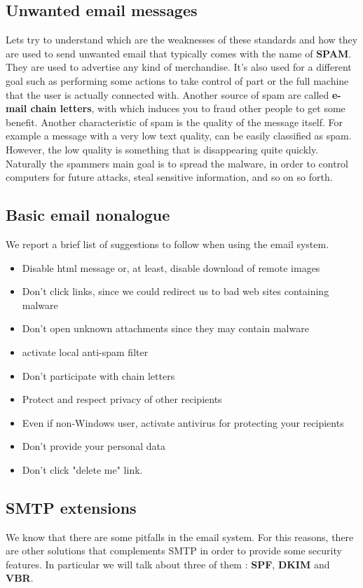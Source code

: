 \subsection{Unwanted email messages}
Lets try to understand which are the weaknesses of these standards and how they are used to send unwanted email that typically comes with the name of \textbf{SPAM}. They are used to advertise any kind of merchandise. It's also used for a different goal such as performing some actions to take control of part or the full machine that the user is actually connected with. Another source of spam are called \textbf{e-mail chain letters}, with which induces you to fraud other people to get some benefit. Another characteristic of spam is the quality of the message itself. For example a message with a very low text quality, can be easily classified as spam. However, the low quality is something that is disappearing quite quickly. Naturally the spammers main goal is to spread the malware, in order to control computers for future attacks, steal sensitive information, and so on so forth.
\subsection{Basic email nonalogue}
We report a brief list of suggestions to follow when using the email system.
\begin{itemize}
\item Disable html message or, at least, disable download of remote images
\item Don't click links, since we could redirect us to bad web sites containing malware
\item Don't open unknown attachments since they may contain malware
\item activate local anti-spam filter
\item Don't participate with chain letters
\item Protect and respect privacy of other recipients
\item Even if non-Windows user, activate antivirus for protecting your recipients
\item Don't provide your personal data
\item Don't click "delete me" link.
\end{itemize}
\subsection{SMTP extensions}
We know that there are some pitfalls in the email system. For this reasons, there are other solutions that complements SMTP in order to provide some security features. In particular we will talk about three of them : \textbf{SPF}, \textbf{DKIM} and \textbf{VBR}.

